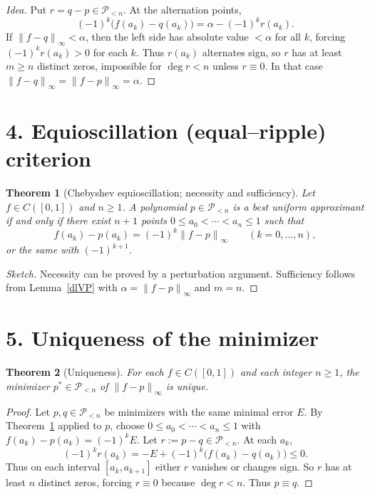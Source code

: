 \documentclass[11pt,a4paper]{article}
\newtheorem{theorem}{Theorem}
\theoremstyle{definition}
\theoremstyle{definition}
\theoremstyle{plain}
\theoremstyle{remark}
\newcommand{\norm}[1]{\left\lVert #1 \right\rVert}
\newcommand{\Pspace}{\mathcal{P}_{<n}}
\begin{document}
\begin{proof}[Idea]
	Put \(r=q-p\in \Pspace\). At the alternation points,
	\[
	(-1)^k\big(f(a_k)-q(a_k)\big) = \alpha - (-1)^k r(a_k).
	\]
	If \(\norm{f-q}_\infty<\alpha\), then the left side has absolute value \(<\alpha\) for all \(k\),
	forcing \((-1)^k r(a_k)>0\) for each \(k\). Thus \(r(a_k)\) alternates sign,
	so \(r\) has at least \(m\ge n\) distinct zeros, impossible for \(\deg r< n\) unless \(r\equiv 0\).
	In that case \(\norm{f-q}_\infty = \norm{f-p}_\infty = \alpha\).
\end{proof}

\section*{4. Equioscillation (equal–ripple) criterion}
\begin{theorem}[Chebyshev equioscillation; necessity and sufficiency]\label{alternation}
	Let \(f\in C([0,1])\) and \(n\ge 1\). A polynomial \(p\in \Pspace\) is a best uniform approximant if and only if
	there exist \(n+1\) points \(0\le a_0<\cdots<a_n\le 1\) such that
	\[
	f(a_k)-p(a_k) = (-1)^k \norm{f-p}_\infty \qquad (k=0,\dots,n),
	\]
	or the same with \((-1)^{k+1}\).
\end{theorem}

\begin{proof}[Sketch]
	Necessity can be proved by a perturbation argument.
	Sufficiency follows from Lemma~\ref{dlVP} with \(\alpha=\norm{f-p}_\infty\) and \(m=n\).
\end{proof}

\section*{5. Uniqueness of the minimizer}
\begin{theorem}[Uniqueness]\label{uniq}
	For each \(f\in C([0,1])\) and each integer \(n\ge 1\), the minimizer \(p^\ast\in \Pspace\)
	of \(\norm{f-p}_\infty\) is unique.
\end{theorem}

\begin{proof}
	Let \(p,q\in \Pspace\) be minimizers with the same minimal error \(E\).
	By Theorem~\ref{alternation} applied to \(p\), choose \(0\le a_0<\cdots<a_n\le 1\) with
	\(f(a_k)-p(a_k)=(-1)^k E\). Let \(r:=p-q\in \Pspace\). At each \(a_k\),
	\[
	(-1)^k r(a_k) = -E + (-1)^k\big(f(a_k)-q(a_k)\big) \le 0 .
	\]
	Thus on each interval \([a_k,a_{k+1}]\) either \(r\) vanishes or changes sign.
	So \(r\) has at least \(n\) distinct zeros, forcing \(r\equiv 0\) because \(\deg r< n\).
	Thus \(p\equiv q\).
\end{proof}
\end{document}
